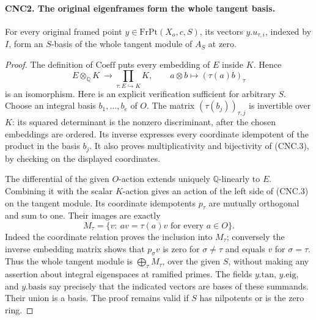 \documentclass[11pt,a4paper]{article}
\numberwithin{equation}{section}
\theoremstyle{remark}\newtheorem{remark}[theorem]{Remark}
\begin{document}
\paragraph{CNC2. The original eigenframes form the whole tangent basis.}
\label{claim:CNC2}
For every original framed point \(y\in\mathrm{FrPt}(X_o,c,S)\), its
vectors \(y.u_{\tau,i}\), indexed by \(I\), form an \(S\)-basis of
the whole tangent module of \(A_S\) at zero.
\begin{proof}
The definition of \(\mathrm{Coeff}\) puts every embedding of \(E\)
inside \(K\).  Hence
\[
 E\otimes_{\mathbb Q}K\ \longrightarrow\prod_{\tau:E\hookrightarrow K}K,
       \qquad a\otimes b\longmapsto(\tau(a)b)_\tau             \tag{CNC.3}
\]
is an isomorphism.  Here is an explicit verification sufficient for
arbitrary \(S\).  Choose an integral basis \(b_1,\ldots,b_e\) of
\(O\).  The matrix \((\tau(b_j))_{\tau,j}\) is invertible over
\(K\): its squared determinant is the nonzero discriminant, after the
chosen embeddings are ordered.  Its inverse expresses every coordinate
idempotent of the product in the basis \(b_j\).  It also proves
multiplicativity and bijectivity of (CNC.3), by checking on the displayed
coordinates.

The differential of the given \(O\)-action extends uniquely
\(\mathbb Q\)-linearly to \(E\).  Combining it with the scalar
\(K\)-action gives an action of the left side of (CNC.3) on the tangent
module.  Its coordinate idempotents \(p_\tau\) are mutually orthogonal
and sum to one.  Their images are exactly
\[
 M_\tau=\{v:\ a v=\tau(a)v\text{ for every }a\in O\}.
\]
Indeed the coordinate relation proves the inclusion into \(M_\tau\);
conversely the inverse embedding matrix shows that \(p_\sigma v\)
is zero for \(\sigma\ne\tau\) and equals \(v\) for
\(\sigma=\tau\).  Thus the whole tangent module is
\(\bigoplus_\tau M_\tau\), over the given \(S\), without making
any assertion about integral eigenspaces at ramified primes.
The fields \(y.\mathrm{tan}\), \(y.\mathrm{eig}\), and
\(y.\mathrm{basis}\) say precisely that the indicated vectors are
bases of these summands.  Their union is a basis.  The proof remains
valid if \(S\) has nilpotents or is the zero ring.
\end{proof}

\end{document}

